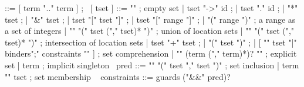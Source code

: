 \begin{syntax}
  [ range ] ::= [ term ".." term ] ;
  \
  [ tset ] ::= { "\empty" } ; empty set
       | { tset "->" id } ;
       | { tset "." id } ;
       | { "*" tset } ;
       | { "&" tset } ;
       | { tset "[" tset "]" } ;
       | { tset "[" range "]" } ;
       | "(" range ")" ; a range as a set of integers
       | { "\union" "(" tset ("," tset)* ")" } ; union of location sets
       | { "\inter" "(" tset ("," tset)* ")" } ; intersection of location sets
       | tset "+" tset ;
       | "(" tset ")" ;
       | [ { "{" tset "|" binders";" constraints "}" } ] ; set comprehension
       | { "{" (term ("," term)*)? "}" } ; explicit set
       | term ; implicit singleton
       \
  pred ::= { "\subset" "(" tset "," tset ")" } ; set inclusion
       | { term "\in" tset } ; set membership
       \
  { constraints } ::= { guards ("&&" pred)? }
\end{syntax}
